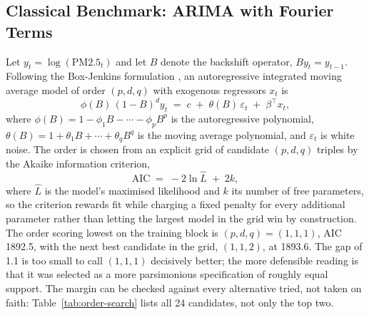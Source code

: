 \documentclass[12pt,a4paper]{report}
\begin{document}
\subsection{Classical Benchmark: ARIMA with Fourier Terms}
\label{sec:arima}

Let $y_t = \log(\text{PM2.5}_t)$ and let $B$ denote the backshift operator,
$B y_t = y_{t-1}$. Following the Box-Jenkins formulation \citep{box2008time},
an autoregressive integrated moving average model of order $(p,d,q)$ with
exogenous regressors $x_t$ is
\begin{equation}
\phi(B)\,(1-B)^d y_t \;=\; c \;+\; \theta(B)\,\varepsilon_t \;+\; \beta^\top x_t,
\label{eq:arima}
\end{equation}
where $\phi(B) = 1 - \phi_1 B - \cdots - \phi_p B^p$ is the autoregressive
polynomial, $\theta(B) = 1 + \theta_1 B + \cdots + \theta_q B^q$ is the moving
average polynomial, and $\varepsilon_t$ is white noise. The order is chosen
from an explicit grid of candidate $(p,d,q)$ triples by the Akaike
information criterion,
\begin{equation}
\mathrm{AIC} \;=\; -2\ln\hat L \;+\; 2k,
\label{eq:aic}
\end{equation}
where $\hat L$ is the model's maximised likelihood and $k$ its number of
free parameters, so the criterion rewards fit while charging a fixed penalty
for every additional parameter rather than letting the largest model in the
grid win by construction. The order scoring lowest on the training block is
$(p,d,q) = (1,1,1)$, AIC 1892.5, with the next best candidate in the grid,
$(1,1,2)$, at 1893.6. The gap of 1.1 is too small to call $(1,1,1)$ decisively
better; the more defensible reading is that it was selected as a more
parsimonious specification of roughly equal support. The margin can be
checked against every alternative tried, not taken on faith:
Table~\ref{tab:order-search} lists all 24 candidates, not only the top two.


\end{document}
